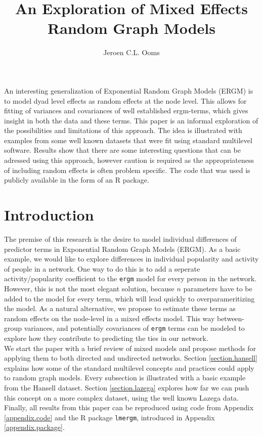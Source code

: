 \documentclass[a4paper]{article}
\begin{document}
\title{An Exploration of Mixed Effects Random Graph Models}
\author{Jeroen C.L. Ooms}

\maketitle

\abstract{}
An interesting generalization of Exponential Random Graph Models (ERGM) is to model dyad level effects as random effects at the node level. 
This allows for fitting of variances and covariances of well established ergm-terms, which gives insight in both the data and these terms.
This paper is an informal exploration of the possibilities and limitations of this approach. 
The idea is illustrated with examples from some well known datasets that were fit using standard multilevel software.
Results show that there are some interesting questions that can be adressed using this approach, however caution is required as the appropriateness of
including random effects is often problem specific. The code that was used is publicly available in the form of an R package.

\section{Introduction}

The premise of this research is the desire to model individual differences of predictor terms in Exponential Random Graph Models (ERGM). As a basic example, 
we would like to explore differences in individual popularity and activity of people in a network. 
One way to do this is to add a seperate activity/popularity coefficient to the \texttt{ergm} model for every person in the network. 
However, this is not the most elegant solution, because $n$ parameters have to be added to the model for every term, which will lead quickly to overparameritizing the model. 
As a natural alternative, we propose to estimate these terms as random effects on the node-level in a mixed effects model. 
This way between-group variances, and potentially covariances of \texttt{ergm} terms can be modeled to explore how they contribute to predicting the ties in our network. \\

We start the paper with a brief review of mixed models and propose methods for applying them to both directed and undirected networks. 
Section \ref{section.hansell} explains how some of the standard multilevel concepts and practices could apply to random graph models.
Every subsection is illustrated with a basic example from the Hansell dataset.
Section \ref{section.lazega} explores how far we can push this concept on a more complex dataset, using the well known Lazega data. 
Finally, all results from this paper can be reproduced using code from Appendix \ref{appendix.code} and the R package \texttt{lmergm}, introduced in Appendix \ref{appendix.package}.\\
\end{document}
